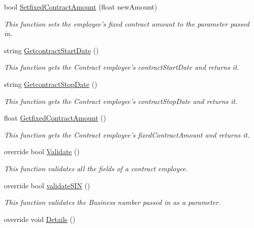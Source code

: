\begin{DoxyCompactItemize}
bool \hyperlink{class_all_employees_1_1_contract_employee_a41840cab97de95c1cb0c8465d8d56b65}{Setfixed\-Contract\-Amount} (float new\-Amount)
\begin{DoxyCompactList}\small\item\em This function sets the employee's fixed contract amount to the parameter passed in. \end{DoxyCompactList}\item 
string \hyperlink{class_all_employees_1_1_contract_employee_a947dd5f3732623e28d0a898f830d5130}{Getcontract\-Start\-Date} ()
\begin{DoxyCompactList}\small\item\em This function gets the Contract employee's contract\-Start\-Date and returns it. \end{DoxyCompactList}\item 
string \hyperlink{class_all_employees_1_1_contract_employee_ad80b5b6ee4639a8952393f26cde075b0}{Getcontract\-Stop\-Date} ()
\begin{DoxyCompactList}\small\item\em This function gets the Contract employee's contract\-Stop\-Date and returns it. \end{DoxyCompactList}\item 
float \hyperlink{class_all_employees_1_1_contract_employee_a8f296957a217b20754106ba9c7ba60b1}{Getfixed\-Contract\-Amount} ()
\begin{DoxyCompactList}\small\item\em This function gets the Contract employee's fixed\-Contract\-Amount and returns it. \end{DoxyCompactList}\item 
override bool \hyperlink{class_all_employees_1_1_contract_employee_aa73b8ebc30a4563e9325912779ab5526}{Validate} ()
\begin{DoxyCompactList}\small\item\em This function validates all the fields of a contract employee. \end{DoxyCompactList}\item 
override bool \hyperlink{class_all_employees_1_1_contract_employee_a1a0b62df589342e937dfb7d3a0b11064}{validate\-S\-I\-N} ()
\begin{DoxyCompactList}\small\item\em This function validates the Business number passed in as a parameter. \end{DoxyCompactList}\item 
override void \hyperlink{class_all_employees_1_1_contract_employee_ac211f3a0e198612f67ae9c63930e8bbb}{Details} ()

\end{DoxyCompactItemize}
